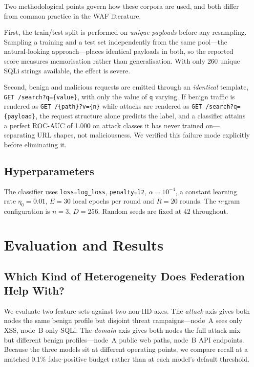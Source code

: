 \documentclass[conference]{IEEEtran}
\begin{document}
Two methodological points govern how these corpora are used, and both differ from common practice in the WAF literature.

First, the train/test split is performed on \emph{unique payloads} before any resampling. Sampling a training and a test set independently from the same pool---the natural-looking approach---places identical payloads in both, so the reported score measures memorisation rather than generalisation. With only 260 unique SQLi strings available, the effect is severe.

Second, benign and malicious requests are emitted through an \emph{identical} template, \texttt{GET /search?q=\{value\}}, with only the value of \texttt{q} varying. If benign traffic is rendered as \texttt{GET /\{path\}?v=\{n\}} while attacks are rendered as \texttt{GET /search?q=\{payload\}}, the request structure alone predicts the label, and a classifier attains a perfect ROC-AUC of 1.000 on attack classes it has never trained on---separating URL shapes, not maliciousness. We verified this failure mode explicitly before eliminating it.

\subsection{Hyperparameters}
The classifier uses \texttt{loss=log\_loss}, \texttt{penalty=l2}, $\alpha = 10^{-4}$, a constant learning rate $\eta_0 = 0.01$, $E = 30$ local epochs per round and $R = 20$ rounds. The $n$-gram configuration is $n=3$, $D=256$. Random seeds are fixed at 42 throughout.

\section{Evaluation and Results}
\label{sec:eval}

\subsection{Which Kind of Heterogeneity Does Federation Help With?}
\label{sec:design-space}
We evaluate two feature sets against two non-IID axes. The \emph{attack} axis gives both nodes the same benign profile but disjoint threat campaigns---node~A sees only XSS, node~B only SQLi. The \emph{domain} axis gives both nodes the full attack mix but different benign profiles---node~A public web paths, node~B API endpoints. Because the three models sit at different operating points, we compare recall at a matched 0.1\% false-positive budget rather than at each model's default threshold.
\end{document}
